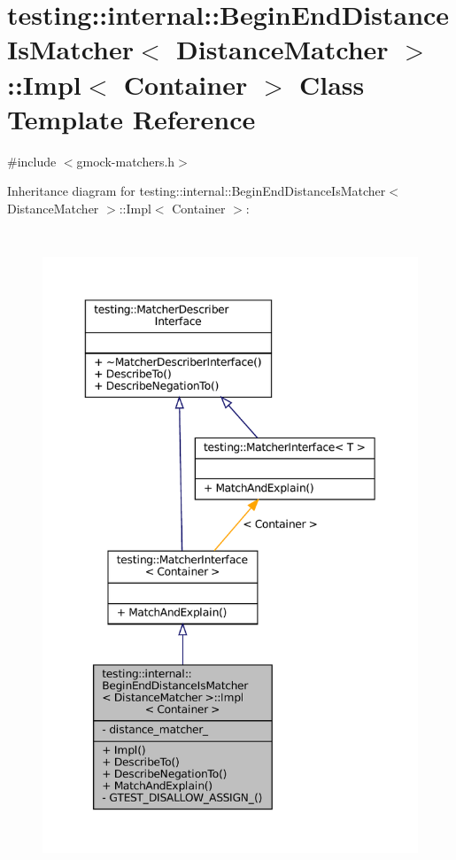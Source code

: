 \hypertarget{classtesting_1_1internal_1_1BeginEndDistanceIsMatcher_1_1Impl}{}\section{testing\+:\+:internal\+:\+:Begin\+End\+Distance\+Is\+Matcher$<$ Distance\+Matcher $>$\+:\+:Impl$<$ Container $>$ Class Template Reference}
\label{classtesting_1_1internal_1_1BeginEndDistanceIsMatcher_1_1Impl}


{\ttfamily \#include $<$gmock-\/matchers.\+h$>$}



Inheritance diagram for testing\+:\+:internal\+:\+:Begin\+End\+Distance\+Is\+Matcher$<$ Distance\+Matcher $>$\+:\+:Impl$<$ Container $>$\+:
\nopagebreak
\begin{figure}[H]
\begin{center}
\leavevmode
\includegraphics[height=550pt]{classtesting_1_1internal_1_1BeginEndDistanceIsMatcher_1_1Impl__inherit__graph}
\end{center}
\end{figure}


